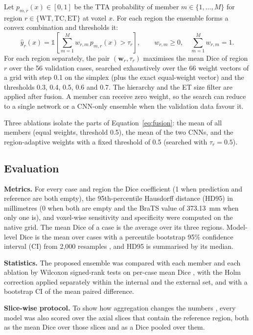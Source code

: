 \documentclass[a4paper,fleqn]{cas-sc}
\begin{document}
Let $p_{m,r}(x)\in[0,1]$ be the TTA probability of member $m\in\{1,\dots,M\}$ for region $r\in\{\mathrm{WT},\mathrm{TC},\mathrm{ET}\}$ at voxel $x$. For each region the ensemble forms a convex combination and thresholds it:
\begin{equation}
\hat{y}_r(x)=\mathbb{1}\!\left[\sum_{m=1}^{M} w_{r,m}\,p_{m,r}(x)>\tau_r\right],\qquad w_{r,m}\geq 0,\quad \sum_{m=1}^{M}w_{r,m}=1.
\label{eq:fusion}
\end{equation}
For each region separately, the pair $(\mathbf{w}_r,\tau_r)$ maximises the mean Dice of region $r$ over the 56 validation cases, searched exhaustively over the 66 weight vectors of a grid with step 0.1 on the simplex (plus the exact equal-weight vector) and the thresholds 0.3, 0.4, 0.5, 0.6 and 0.7. The hierarchy and the ET size filter are applied after fusion. A member can receive zero weight, so the search can reduce to a single network or a CNN-only ensemble when the validation data favour it.

Three ablations isolate the parts of Equation~\ref{eq:fusion}: the mean of all members (equal weights, threshold 0.5), the mean of the two CNNs, and the region-adaptive weights with a fixed threshold of 0.5 (searched with $\tau_r=0.5$).

\subsection{Evaluation}
\label{sec:evaluation}

\textbf{Metrics.} For every case and region the Dice coefficient (1 when prediction and reference are both empty), the 95th-percentile Hausdorff distance (HD95) in millimetres (0 when both are empty and the BraTS value of 373.13~mm when only one is), and voxel-wise sensitivity and specificity were computed on the native grid. The mean Dice of a case is the average over its three regions. Model-level Dice is the mean over cases with a percentile bootstrap 95\% confidence interval (CI) from 2,000 resamples \citep{efron1979}, and HD95 is summarised by its median.

\textbf{Statistics.} The proposed ensemble was compared with each member and each ablation by Wilcoxon signed-rank tests on per-case mean Dice \citep{wilcoxon1945}, with the Holm correction \citep{holm1979} applied separately within the internal and the external set, and with a bootstrap CI of the mean paired difference.

\textbf{Slice-wise protocol.} To show how aggregation changes the numbers \citep{maierhein2024}, every model was also scored over the axial slices that contain the reference region, both as the mean Dice over those slices and as a Dice pooled over them.
\end{document}
